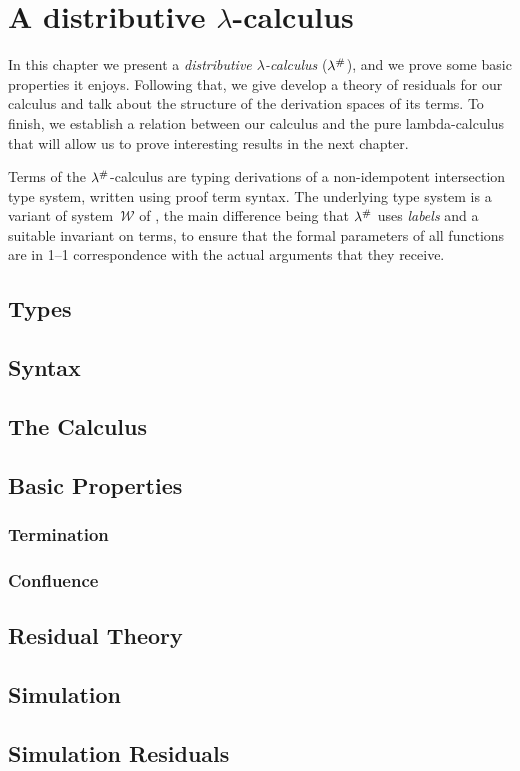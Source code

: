 \chapter{A distributive $\lambda$-calculus}

In this chapter we present a
{\em distributive $\lambda$-calculus} ($\lambda^{\mathtt{\#}}$),
and we prove some basic properties it enjoys.
Following that, we give develop a theory of residuals for our calculus and talk
about the structure of the derivation spaces of its terms.
To finish, we establish a relation between our calculus and the pure lambda-calculus
that will allow us to prove interesting results in the next chapter.

Terms of the $\lambda^{\mathtt{\#}}$-calculus are typing derivations of a non-idempotent intersection type
system, written using proof term syntax.
The underlying type system is a variant of
system~$\mathcal{W}$ of \cite{bucciarelli2014inhabitation,bucciarelli2017non},
the main difference being that $\lambda^{\mathtt{\#}}$
uses {\em labels} and a suitable invariant on terms,
to ensure that the formal parameters of all functions
are in 1--1 correspondence with the actual arguments that they receive.

\section{Types}


\section{Syntax}


\section{The Calculus}


\section{Basic Properties}


\subsection{Termination}



\subsection{Confluence}

\section{Residual Theory}

\section{Simulation}

\section{Simulation Residuals}

